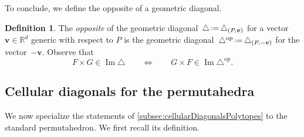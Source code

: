 \documentclass{amsart}
\newcommand{\darkblue}{\color{darkblue}} %
\theoremstyle{definition}
\newtheorem{definition}[theorem]{Definition}
\newcommand{\R}{\mathbb{R}} %
\renewcommand{\b}[1]{{\boldsymbol{#1}}} %
\newcommand{\eqdef}{\mbox{\,\raisebox{0.2ex}{\scriptsize\ensuremath{\mathrm:}}\ensuremath{=}\,}} %
\DeclareMathOperator{\Ima}{Im} %
\newcommand{\defn}[1]{\textsl{\darkblue #1}} %
\renewcommand{\b}[1]{\boldsymbol{#1}} %
\newcommand{\op}{\mathrm{op}}
\begin{document}
To conclude, we define the opposite of a geometric diagonal.

\begin{definition}
\label{def:oppositeDiagonal}
The \defn{opposite} of the geometric diagonal~$\triangle \eqdef \triangle_{(P, \b{v})}$ for a vector~$\b{v} \in \R^d$ generic with respect to $P$ is the geometric diagonal~$\triangle^{\op} \eqdef \triangle_{(P, -\b{v})}$ for the vector~$-\b{v}$.
Observe that
\[{
F \times G \in \Ima \triangle} \qquad\iff\qquad G \times F \in \Ima \triangle^{\op}.
\]
\end{definition}


\subsection{Cellular diagonals for the permutahedra}
\label{sec:cellularDiagonalsPermutahedra}

We now specialize the statements of \cref{subsec:cellularDiagonalsPolytopes} to the standard permutahedron.
We first recall its definition.
\end{document}
